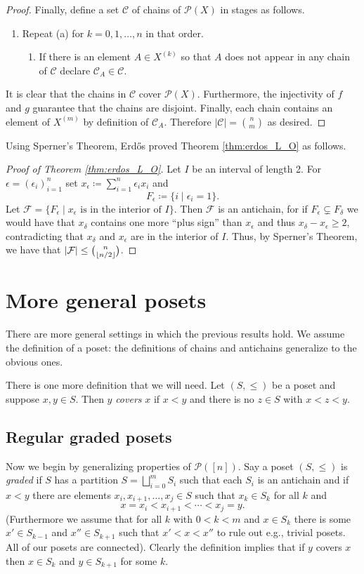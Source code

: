 \documentclass{report}
\DeclarePairedDelimiter\floor{\lfloor}{\rfloor}
\theoremstyle{definition}
\theoremstyle{plain}
\theoremstyle{definition}
\begin{document}
\begin{proof}
 		Finally, define a set $\mathcal{C}$ of chains of $\mathcal{P}(X)$ in stages as follows.
 		\begin{enumerate}
 			\item Repeat (a) for $k = 0, 1, \ldots, n$ in that order.
 			\begin{enumerate}
 				\item If there is an element $A \in X^{(k)}$ so that $A$ does not appear in any chain of $\mathcal{C}$ declare $\mathcal{C}_A\in\mathcal{C}$.
 			\end{enumerate}
 		\end{enumerate}
 		It is clear that the chains in $\mathcal{C}$ cover $\mathcal{P}(X)$. Furthermore, the injectivity of $f$ and $g$ guarantee that the chains are disjoint. Finally, each chain contains an element of $X^{(m)}$ by definition of $\mathcal{C}_A$. Therefore $|\mathcal{C}| = \binom{n}{m}$ as desired.
 	\end{proof}
 	Using Sperner's Theorem, Erd\H{o}s proved Theorem \ref{thm:erdos_L_O} as follows.
 	\begin{proof}[Proof of Theorem \ref{thm:erdos_L_O}]
 		Let $I$ be an interval of length 2. For $\epsilon = (\epsilon_i)_{i=1}^{n}$ set $x_\epsilon \coloneqq \sum_{i=1}^{n}\epsilon_ix_i$ and 
 		\[F_\epsilon \coloneqq \{i \mid \epsilon_i = 1\}.\]
 		Let $\mathcal{F} = \{F_\epsilon \mid \text{$x_\epsilon$ is in the interior of $I$}\}$. Then $\mathcal{F}$ is an antichain, for if $F_\epsilon \subsetneq F_\delta$ we would have that $x_\delta$ contains one more ``plus sign'' than $x_\epsilon$ and thus $x_\delta - x_\epsilon \geq 2$, contradicting that $x_\delta$ and $x_\epsilon$ are in the interior of $I$. Thus, by Sperner's Theorem, we have that $|\mathcal{F}| \leq \binom{n}{\floor{n/2}}$. 
 	\end{proof}
 	\section{More general posets}
 	There are more general settings in which the previous results hold. We assume the definition of a poset: the definitions of chains and antichains generalize to the obvious ones.
 	
 	There is one more definition that we will need. Let $(S,\leq)$ be a poset and suppose $x,y\in S$. Then $y$ \emph{covers} $x$ if $x<y$ and there is no $z\in S$ with $x < z < y$.
 	\subsection{Regular graded posets}
 	Now we begin by generalizing properties of $\mathcal{P}([n])$. Say a poset $(S,\leq)$ is \emph{graded} if $S$ has a partition $S = \bigsqcup_{i=0}^{m}S_i$ such that each $S_i$ is an antichain and if $x<y$ there are elements $x_i,x_{i+1},\ldots,x_j\in S$ such that $x_k\in S_k$ for all $k$ and
 	\[
 		x= x_i < x_{i+1} < \cdots <x_j = y.
 	\]
 	(Furthermore we assume that for all $k$ with $0<k<m$ and $x\in S_k$ there is some $x' \in S_{k-1}$ and $x''\in S_{k+1}$ such that $x' < x < x''$ to rule out e.g., trivial posets. All of our posets are connected). Clearly the definition implies that if $y$ covers $x$ then $x\in S_k$ and $y\in S_{k+1}$ for some $k$.
 	
\end{document}
